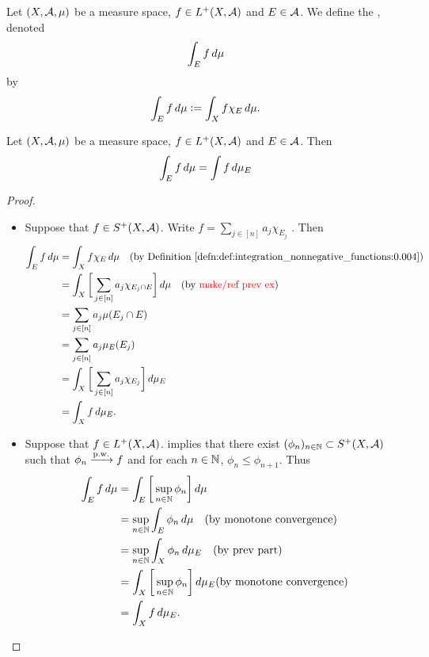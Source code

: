 \documentclass{book}
\begin{document}
	\begin{defn} 
		Let $(X, \mathcal{A}, \mu)$ be a measure space, $f \in L^+(X, \mathcal{A})$ and $E \in \mathcal{A}$. We define the , denoted 
		$$\int_E f \, d \mu$$
		by 
		$$\int_E f \, d \mu \vcentcolon= \int_X f \chi_E \, d \mu.$$
	\end{defn}

	\begin{ex} 
		Let $(X, \mathcal{A}, \mu)$ be a measure space, $f \in L^+(X, \mathcal{A})$ and $E \in \mathcal{A}$. Then 
		$$\int_E f \, d \mu = \int f \, d \mu_E$$ 
	\end{ex}
	
	\begin{proof}\
		\begin{itemize}
			\item Suppose that $f \in S^+(X, \mathcal{A})$. Write $f = \sum\limits_{j \in [n]} a_j \chi_{E_j} $ . Then 
			\begin{align*}
				\int_E f \dmu 
				& = \int_X f \chi_E \dmu \quad \text{(by \rd{def:integration_nonnegative_functions:0.004})} \\ 
				& = \int_X \bigg[ \sum\limits_{j \in [n]}  a_j \chi_{E_j \cap E} \bigg] \dmu \quad \text{(by \tcr{make/ref prev ex})} \\
				& = \sum\limits_{j \in [n]} a_j \mu(E_j \cap E) \\
				& = \sum\limits_{j \in [n]} a_j \mu_E(E_j) \\
				& = \int_X \bigg[ \sum\limits_{j \in [n]} a_j \chi_{E_j} \bigg] \dmu_E \\
				& = \int_X f \dmu_E.
			\end{align*}
			\item Suppose that $f \in L^+(X, \mathcal{A})$.  implies that there exist $(\phi_n)_{n \in \mathbb{N}} \subset S^+(X, \mathcal{A})$ such that $\phi_n \xrightarrow{\text{p.w.}} f$ and for each $n \in \mathbb{N}$, $\phi_n \leq \phi_{n+1}$. Thus
			\begin{align*}
				\int_E f \, d \mu 
				& = \int_E \bigg[ \sup\limits_{n \in \mathbb{N}} \phi_n \bigg] \, d \mu \\
				& = \sup\limits_{n \in \mathbb{N}} \int_E \phi_n \, d \mu \quad \text{(by monotone convergence)} \\
				& = \sup\limits_{n \in \mathbb{N}} \int_X \phi_n \, d \mu_E \quad \text{(by prev part)} \\
				& = \int_X \bigg[ \sup\limits_{n \in \mathbb{N}} \phi_n \bigg] \, d \mu_E \text{(by monotone convergence)} \\
				& = \int_X f \, d \mu_E.
			\end{align*}
		\end{itemize}
	\end{proof}	
\end{document}
